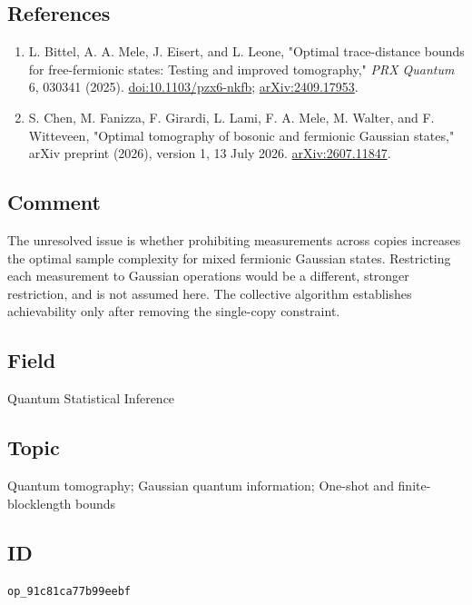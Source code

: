 \subsection*{References}

\begin{enumerate}[label={},leftmargin=4.8em,labelsep=0.5em]
  \footnotesize
  \item[\textup{[Bittel25]}]\label{ref:91c8-bittel25}
  L. Bittel, A. A. Mele, J. Eisert, and L. Leone, "Optimal trace-distance bounds for free-fermionic states: Testing and improved tomography," \emph{PRX Quantum} 6, 030341 (2025). \href{https://doi.org/10.1103/pzx6-nkfb}{doi:10.1103/pzx6-nkfb}; \href{https://arxiv.org/abs/2409.17953}{arXiv:2409.17953}.

  \item[\textup{[Chen26]}]\label{ref:91c8-chen26}
  S. Chen, M. Fanizza, F. Girardi, L. Lami, F. A. Mele, M. Walter, and F. Witteveen, "Optimal tomography of bosonic and fermionic Gaussian states," arXiv preprint (2026), version 1, 13 July 2026. \href{https://arxiv.org/abs/2607.11847}{arXiv:2607.11847}.
\end{enumerate}

\subsection*{Comment}

The unresolved issue is whether prohibiting measurements across copies increases the optimal sample complexity for mixed fermionic Gaussian states. Restricting each measurement to Gaussian operations would be a different, stronger restriction, and is not assumed here. The collective algorithm establishes achievability only after removing the single-copy constraint.

\subsection*{Field}

Quantum Statistical Inference

\subsection*{Topic}

Quantum tomography; Gaussian quantum information; One-shot and finite-blocklength bounds

\subsection*{ID}

\texttt{op\_91c81ca77b99eebf}
